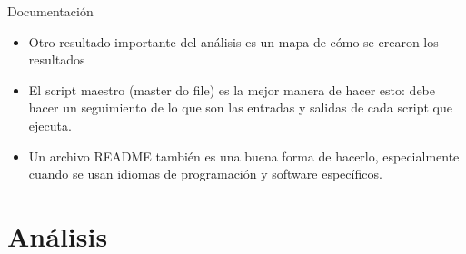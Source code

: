 \documentclass[10pt, aspectratio=169, compress]{beamer}
\begin{document}
\begin{frame}{Documentación}
	\begin{itemize}
		\item Otro resultado importante del análisis es un mapa de cómo se crearon los resultados
		\item El script maestro (master do file) es la mejor manera de hacer esto: debe hacer un seguimiento de lo que son las entradas y salidas de cada script que ejecuta.
		\item Un archivo README también es una buena forma de hacerlo, especialmente cuando se usan idiomas de programación y software específicos.
	\end{itemize}
\end{frame}
\section{Análisis}
\end{document}
